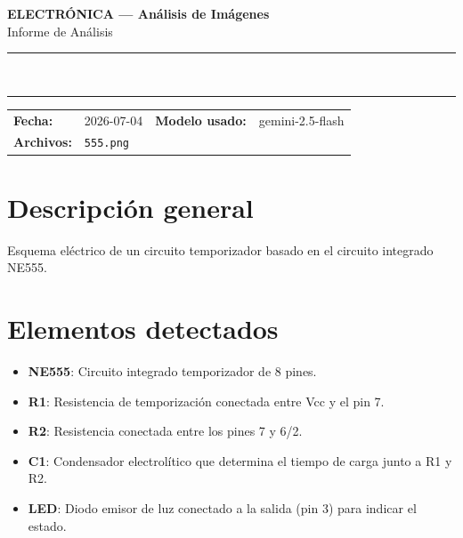 \documentclass[11pt,a4paper]{article}
\begin{document}
\begin{center}
  {\Large\bfseries\color{azulTitulo} ELECTRÓNICA --- Análisis de Imágenes}\\[4pt]
  {\large Informe de Análisis}\\[12pt]
  \rule{\linewidth}{1.2pt}\\[6pt]
  \rule{\linewidth}{0.6pt}
\end{center}

\vspace{4pt}
\begin{tcolorbox}[cajaTitulo, title=Datos del análisis]
\begin{tabular}{@{}llll@{}}
  \textbf{Fecha:}       & 2026-07-04  &
  \textbf{Modelo usado:} & gemini-2.5-flash \\[4pt]
  \textbf{Archivos:}    & \multicolumn{3}{l}{\texttt{555.png}} \\
\end{tabular}
\end{tcolorbox}

\section*{Descripción general}
Esquema eléctrico de un circuito temporizador basado en el circuito integrado NE555.

\section*{Elementos detectados}
\begin{itemize}[leftmargin=1.5em, itemsep=2pt]
  \item \textbf{NE555}: Circuito integrado temporizador de 8 pines.
  \item \textbf{R1}: Resistencia de temporización conectada entre Vcc y el pin 7.
  \item \textbf{R2}: Resistencia conectada entre los pines 7 y 6/2.
  \item \textbf{C1}: Condensador electrolítico que determina el tiempo de carga junto a R1 y R2.
  \item \textbf{LED}: Diodo emisor de luz conectado a la salida (pin 3) para indicar el estado.
\end{itemize}
\end{document}
